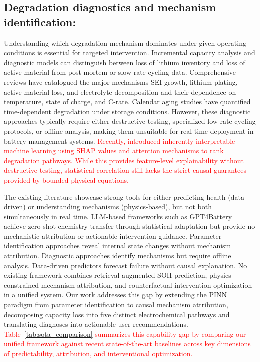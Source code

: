 \documentclass[5p,times,authoryear]{elsarticle}
\begin{document}
\subsection{Degradation diagnostics and mechanism identification:}
Understanding which degradation mechanism dominates under given operating conditions is essential for targeted intervention. Incremental capacity analysis \citep{bloom2005differential} and diagnostic models \citep{dubarry2017synthesize, birkl2017degradation} can distinguish between loss of lithium inventory and loss of active material from post-mortem or slow-rate cycling data. Comprehensive reviews \citep{vetter2005ageing, edge2021lithium} have catalogued the major mechanisms SEI growth, lithium plating, active material loss, and electrolyte decomposition and their dependence on temperature, state of charge, and C-rate. Calendar aging studies \citep{schimpe2018comprehensive, ecker2014calendar, keil2016calendar, wright2002calendar} have quantified time-dependent degradation under storage conditions. However, these diagnostic approaches typically require either destructive testing, specialized low-rate cycling protocols, or offline analysis, making them unsuitable for real-time deployment in battery management systems. \textcolor{red}{Recently, \citet{wu2024inherent} introduced inherently interpretable machine learning using SHAP values and attention mechanisms to rank degradation pathways. While this provides feature-level explainability without destructive testing, statistical correlation still lacks the strict causal guarantees provided by bounded physical equations.}


The existing literature showcase strong tools for either predicting health (data-driven) or understanding mechanisms (physics-based), but not both simultaneously in real time. LLM-based frameworks such as GPT4Battery \citep{zhao2024gpt4battery} achieve zero-shot chemistry transfer through statistical adaptation but provide no mechanistic attribution or actionable intervention guidance. Parameter identification approaches \citep{gu2026realtime} reveal internal state changes without mechanism attribution. Diagnostic approaches \citep{birkl2017degradation, dubarry2017synthesize} identify mechanisms but require offline analysis. Data-driven predictors \citep{severson2019nature, roman2021machine} forecast failure without causal explanation. No existing framework combines retrieval-augmented SOH prediction, physics-constrained mechanism attribution, and counterfactual intervention optimization in a unified system. Our work addresses this gap by extending the PINN paradigm from parameter identification to causal mechanism attribution, decomposing capacity loss into five distinct electrochemical pathways and translating diagnoses into actionable user recommendations. \textcolor{red}{Table~\ref{tab:sota_comparison} summarizes this capability gap by comparing our unified framework against recent state-of-the-art baselines across key dimensions of predictability, attribution, and interventional optimization.}
\end{document}
